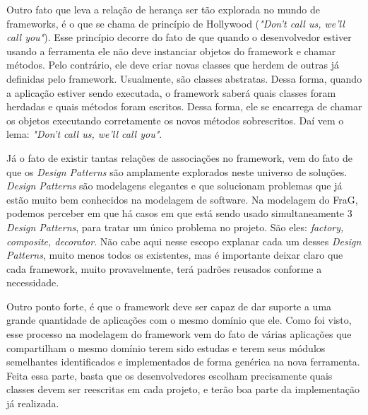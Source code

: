 \documentclass[
    12pt,       %
    openright,      %
    twoside,      %
    a4paper,      %
    english,      %
    french,       %
    spanish,      %
    brazil,       %
    ]{abntex2}
\begin{document}
          Outro fato que leva a relação de herança ser tão explorada no mundo de frameworks,
          é o que se chama de princípio de Hollywood (\textit{"Don't call us, we'll call you"}).
          Esse princípio decorre do fato de que quando o desenvolvedor estiver usando a
          ferramenta ele não deve instanciar objetos do framework e chamar métodos. Pelo
          contrário, ele deve criar novas classes que herdem de outras já definidas pelo
          framework. Usualmente, são classes abstratas. Dessa forma, quando a aplicação
          estiver sendo executada, o framework saberá quais classes foram herdadas e
          quais métodos foram escritos. Dessa forma, ele se encarrega de chamar
          os objetos executando corretamente os novos métodos sobrescritos. Daí
          vem o lema: \textit{"Don't call us, we'll call you"}.

          Já o fato de existir tantas relações de associações no framework, vem
          do fato de que os \textit{Design Patterns} são amplamente explorados neste universo de
          soluções. \textit{Design Patterns} são modelagens
          elegantes e que solucionam problemas que já estão muito bem conhecidos na
          modelagem de software. Na modelagem do FraG, podemos perceber em que há
          casos em que está sendo usado simultaneamente 3 \textit{Design Patterns}, para tratar um único problema no projeto.
          São eles: \textit{factory, composite, decorator}. Não cabe aqui nesse escopo explanar
          cada um desses \textit{Design Patterns}, muito menos todos os existentes,
          mas é importante deixar claro que cada framework, muito provavelmente, terá
          padrões reusados conforme a necessidade.

          Outro ponto forte, é que o framework deve ser capaz de dar suporte a
          uma grande quantidade de aplicações com o mesmo domínio que ele. Como foi
          visto, esse processo na modelagem do framework vem do fato de várias
          aplicações que compartilham o mesmo domínio terem sido
          estudas e terem seus módulos semelhantes identificados e implementados
          de forma genérica na nova ferramenta. Feita essa parte, basta que
          os desenvolvedores escolham precisamente quais classes devem ser reescritas
          em cada projeto, e terão boa parte da implementação já realizada.

\end{document}
